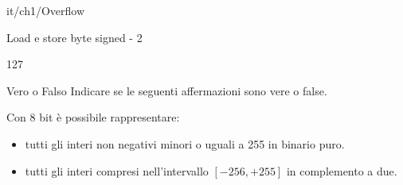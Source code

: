 \documentclass[11pt]{article}
\begin{document}
\begin{quiz}{it/ch1/Overflow}
\begin{cloze}[points=1,shuffle=true]{Load e store byte signed - 2}
    \begin{numerical}
        \item 127
    \end{numerical}    
\end{cloze}

\begin{cloze}[points=1,shuffle=false]{Vero o Falso}
    Indicare se le seguenti affermazioni sono vere o false.
    
    Con 8 bit è possibile rappresentare:
    \begin{itemize}
    \item tutti gli interi non negativi minori o uguali a 255 in binario puro.
    \item tutti gli interi compresi nell'intervallo $[-256,+255]$ in complemento a due.
\end{itemize}
\end{cloze}

\end{quiz}
\end{document}
